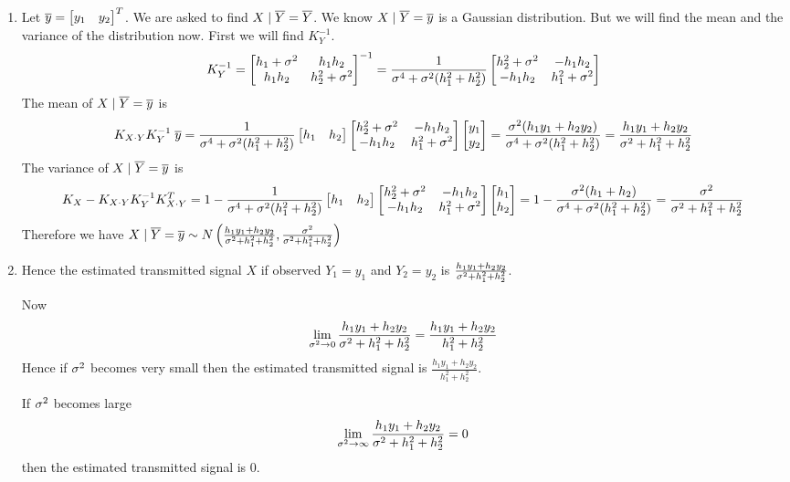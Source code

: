 \documentclass[a4paper, 11pt]{article}
\begin{document}
{\begin{enumerate}[label=(\alph*)]
        \item  Let $\overline{y}=\left[\begin{matrix}y_1 & y_2\end{matrix}\right]^T$. We are asked to find $X\mid \overline{Y}=\overline{Y}$. We know $X\mid \overline{Y}=\overline{y}$ is a Gaussian distribution. But we will find the mean and the variance of the distribution now. First we will find $K_Y^{-1}$. $$K_Y^{-1}=\left[\begin{matrix}h_1+\sigma^2 & h_1h_2\\ h_1h_2 & h_2^2+\sigma^2\end{matrix}\right]^{-1}=\frac1{\sigma^4+\sigma^2(h_1^2+h_2^2)}\left[\begin{matrix}h_2^2+\sigma^2& -h_1h_2\\ -h_1h_2& h_1^2+\sigma^2\end{matrix}\right]$$The mean of $X\mid \overline{Y}=\overline{y}$ is $$K_{X\cdot Y}K_Y^{-1}\;\overline{y}=\frac1{\sigma^4+\sigma^2(h_1^2+h_2^2)}\left[\begin{matrix}h_1 & h_2\end{matrix}\right]\left[\begin{matrix}h_2^2+\sigma^2& -h_1h_2\\ -h_1h_2& h_1^2+\sigma^2\end{matrix}\right]\left[\begin{matrix}y_1\\ y_2\end{matrix}\right]=\frac{\sigma^2(h_1y_1+h_2y_2)}{\sigma^4+\sigma^2(h_1^2+h_2^2)}=\frac{h_1y_1+h_2y_2}{\sigma^2+h_1^2+h_2^2}$$The variance of $X\mid \overline{Y}=\overline{y}$ is $$ K_X-K_{X\cdot Y}K_Y^{-1}K_{X\cdot Y}^T=1-\frac1{\sigma^4+\sigma^2(h_1^2+h_2^2)}\left[\begin{matrix}h_1 & h_2\end{matrix}\right]\left[\begin{matrix}h_2^2+\sigma^2& -h_1h_2\\ -h_1h_2& h_1^2+\sigma^2\end{matrix}\right]\left[\begin{matrix}h_1\\h_2\end{matrix}\right]=1-\frac{\sigma^2(h_1+h_2)}{\sigma^4+\sigma^2(h_1^2+h_2^2)}=
            \frac{\sigma^2}{\sigma^2+h_1^2+h_2^2}$$
            Therefore we have $X\mid \overline{Y}=\overline{y}\sim N\left(\frac{h_1y_1+h_2y_2}{\sigma^2+h_1^2+h_2^2},\frac{\sigma^2}{\sigma^2+h_1^2+h_2^2}\right)$
        \item Hence the estimated transmitted signal $X$ if observed $Y_1=y_1$ and $Y_2=y_2$ is $\frac{h_1y_1+h_2y_2}{\sigma^2+h_1^2+h_2^2}$. \parinn

            Now $$\lim_{\sigma^2\to 0}\frac{h_1y_1+h_2y_2}{\sigma^2+h_1^2+h_2^2}=\frac{h_1y_1+h_2y_2}{h_1^2+h_2^2}$$Hence if $\sigma^2$ becomes very small then the estimated transmitted signal is $\frac{h_1y_1+h_2y_2}{h_1^2+h_2^2}$. 

            If $\sigma^2$ becomes large $$\lim_{\sigma^2\to \infty}\frac{h_1y_1+h_2y_2}{\sigma^2+h_1^2+h_2^2}=0$$then the estimated transmitted signal is $0$.
    \end{enumerate}                                                                                                                                                                                                                                                                                                                                                                                                                                                      
}

\end{document}

